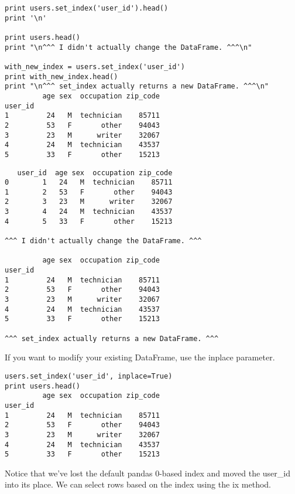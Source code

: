 \documentclass[]{article}
\begin{document}
\begin{framed}
\begin{verbatim}
print users.set_index('user_id').head()
print '\n'

print users.head()
print "\n^^^ I didn't actually change the DataFrame. ^^^\n"

with_new_index = users.set_index('user_id')
print with_new_index.head()
print "\n^^^ set_index actually returns a new DataFrame. ^^^\n"
         age sex  occupation zip_code
user_id                              
1         24   M  technician    85711
2         53   F       other    94043
3         23   M      writer    32067
4         24   M  technician    43537
5         33   F       other    15213

\end{verbatim}
\end{framed}
\begin{framed}
	\begin{verbatim}
   user_id  age sex  occupation zip_code
0        1   24   M  technician    85711
1        2   53   F       other    94043
2        3   23   M      writer    32067
3        4   24   M  technician    43537
4        5   33   F       other    15213

^^^ I didn't actually change the DataFrame. ^^^

         age sex  occupation zip_code
user_id                              
1         24   M  technician    85711
2         53   F       other    94043
3         23   M      writer    32067
4         24   M  technician    43537
5         33   F       other    15213

^^^ set_index actually returns a new DataFrame. ^^^

\end{verbatim}
\end{framed}
If you want to modify your existing DataFrame, use the inplace parameter.


\begin{framed}
\begin{verbatim}
users.set_index('user_id', inplace=True)
print users.head()
         age sex  occupation zip_code
user_id                              
1         24   M  technician    85711
2         53   F       other    94043
3         23   M      writer    32067
4         24   M  technician    43537
5         33   F       other    15213
\end{verbatim}
\end{framed}

Notice that we've lost the default pandas 0-based index and moved the user\_id into its place. We can select rows based on the index using the ix method.
\end{document}
